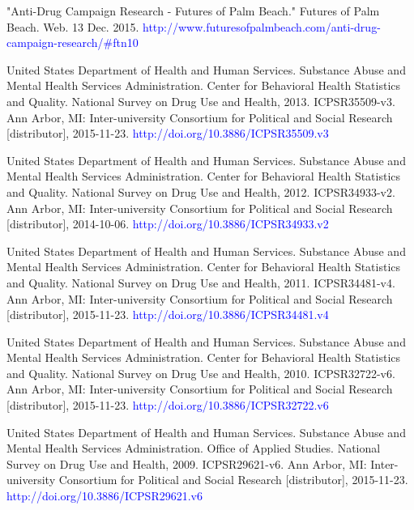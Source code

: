 \documentclass[a4 paper]{article}
\begin{document}
\pagebreak


\begin{thebibliography}{1}
	 "Anti-Drug Campaign Research - Futures of Palm Beach." Futures of Palm Beach. Web. 13 Dec. 2015. \textcolor{blue}{http://www.futuresofpalmbeach.com/anti-drug-campaign-research/\#\textunderscore ftn10}
	
	 United States Department of Health and Human Services. Substance Abuse and Mental Health Services Administration. Center for Behavioral Health Statistics and Quality. National Survey on Drug Use and Health, 2013. ICPSR35509-v3. Ann Arbor, MI: Inter-university Consortium for Political and Social Research [distributor], 2015-11-23. \textcolor{blue}{http://doi.org/10.3886/ICPSR35509.v3}
	
	 United States Department of Health and Human Services. Substance Abuse and Mental Health Services Administration. Center for Behavioral Health Statistics and Quality. National Survey on Drug Use and Health, 2012. ICPSR34933-v2. Ann Arbor, MI: Inter-university Consortium for Political and Social Research [distributor], 2014-10-06. \textcolor{blue}{http://doi.org/10.3886/ICPSR34933.v2}
	
	 United States Department of Health and Human Services. Substance Abuse and Mental Health Services Administration. Center for Behavioral Health Statistics and Quality. National Survey on Drug Use and Health, 2011. ICPSR34481-v4. Ann Arbor, MI: Inter-university Consortium for Political and Social Research [distributor], 2015-11-23. \textcolor{blue}{http://doi.org/10.3886/ICPSR34481.v4}
	
	 United States Department of Health and Human Services. Substance Abuse and Mental Health Services Administration. Center for Behavioral Health Statistics and Quality. National Survey on Drug Use and Health, 2010. ICPSR32722-v6. Ann Arbor, MI: Inter-university Consortium for Political and Social Research [distributor], 2015-11-23. \textcolor{blue}{http://doi.org/10.3886/ICPSR32722.v6}
	
	 United States Department of Health and Human Services. Substance Abuse and Mental Health Services Administration. Office of Applied Studies. National Survey on Drug Use and Health, 2009. ICPSR29621-v6. Ann Arbor, MI: Inter-university Consortium for Political and Social Research [distributor], 2015-11-23. \textcolor{blue}{http://doi.org/10.3886/ICPSR29621.v6}
	

\end{thebibliography}
\end{document}
